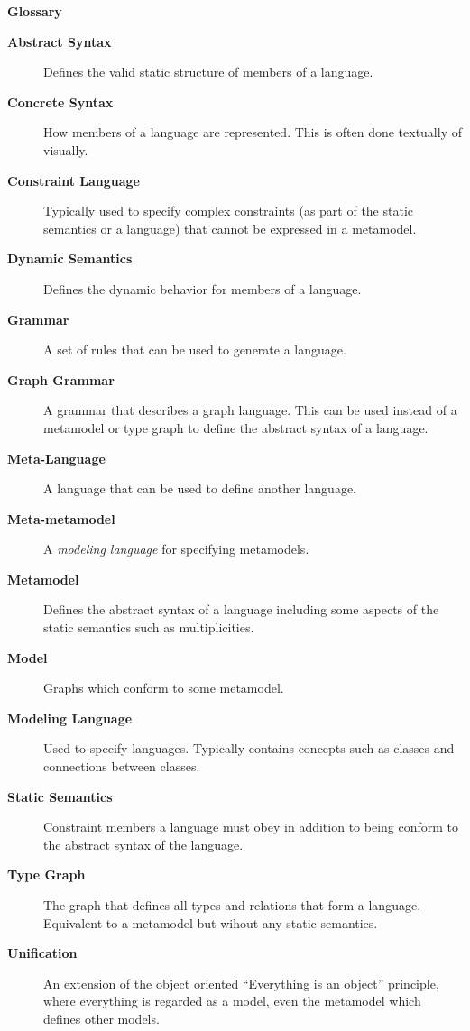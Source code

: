 \newpage
{}
{}

\vspace{1cm}
{\Huge \bf Glossary}
\vspace{1cm}

\begin{description}

\item[\bf Abstract Syntax] 
Defines the valid static structure of members of a language. 

\item[\bf Concrete Syntax]
How members of a language are represented. This is often done textually of visually.

\item[\bf Constraint Language] 
Typically used to specify complex constraints (as part of the static semantics or a language) that cannot be expressed in a metamodel.

\item[\bf Dynamic Semantics] 
Defines the dynamic behavior for members of a language.

\item[\bf Grammar] 
A set of rules that can be used to generate a language. 

\item[\bf Graph Grammar] 
A grammar that describes a graph language. This can be used instead of a metamodel or type graph to define the abstract syntax of a language.

\item[\bf Meta-Language] 
A language that can be used to define another language.

\item[\bf Meta-metamodel] 
A \emph{modeling language} for specifying metamodels.

\item[\bf Metamodel] 
Defines the abstract syntax of a language including some aspects of the static semantics such as multiplicities. 

\item[\bf Model] 
Graphs which conform to some metamodel.

\item[\bf Modeling Language] 
Used to specify languages. Typically contains concepts such as classes and connections between classes.

\item[\bf Static Semantics] 
Constraint members a language must obey in addition to being conform to the abstract syntax of the language.

\item[\bf Type Graph] 
The graph that defines all types and relations that form a language. Equivalent to a metamodel but wihout any static semantics.

\item[\bf Unification]  
An extension of the object oriented ``Everything is an object'' principle, where everything is regarded as a model, even the metamodel which defines other
models.


\end{description}